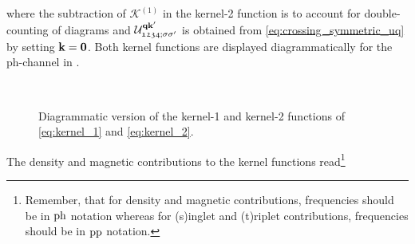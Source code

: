 \documentclass[\main/main.tex]{subfiles}
\begin{document}
where the subtraction of $\mathcal{K}^{(1)}$ in the kernel-2 function is to account for double-counting of diagrams and $\mathcal{U}^{\textbf{qk}'}_{\mathfrak{1234};\sigma\sigma'}$ is obtained from \eqref{eq:crossing_symmetric_uq} by setting $\textbf{k}=\textbf{0}$. Both kernel functions are displayed diagrammatically for the ph-channel in .
\begin{figure}[ht!]
  \centering
  \subfloat{}\\[0.5cm]
  \hspace{-0.25cm}\subfloat{}
  \caption{Diagrammatic version of the kernel-1 and kernel-2 functions of \eqref{eq:kernel_1} and \eqref{eq:kernel_2}.}
  \label{fig:kernel_functions}
\end{figure}
The density and magnetic contributions to the kernel functions read\footnote{Remember, that for density and magnetic contributions, frequencies should be in $\text{ph}$ notation whereas for (s)inglet and (t)riplet contributions, frequencies should be in $\text{pp}$ notation.}
\end{document}

